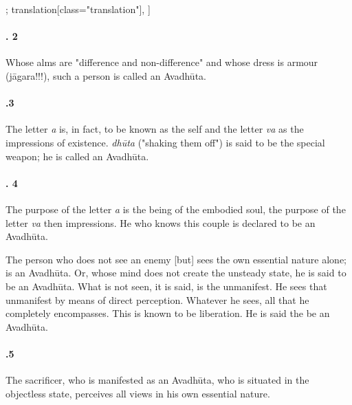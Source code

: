 \begin{alignment}[
  texts=edition[class="edition"];
  translation[class="translation"],
  ]
\begin{translation}
\begin{tlate}
      \paragraph{. 2} Whose alms are "difference and non-difference" and whose dress is armour (jāgara!!!), such a person is called an Avadhūta.

      \paragraph{.3} The letter \textit{a} is, in fact, to be known as the self and the letter \textit{va} as the impressions of existence. \textit{dhūta} ("shaking them off") is said to be the special weapon; he is called an Avadhūta.
      
      \paragraph{. 4} The purpose of the letter \textit{a} is the being of the embodied soul, the purpose of the letter \textit{va} then impressions. He who knows this couple is declared to be an Avadhūta.
      
      \bigskip
      The person who does not see an enemy [but] sees the own essential nature alone; is an Avadhūta. Or, whose mind does not create the unsteady state, he is said to be an Avadhūta. What is not seen, it is said, is the unmanifest. He sees that unmanifest by means of direct perception. Whatever he sees, all that he completely encompasses. This is known to be liberation. He is said the be an Avadhūta.

      \paragraph{.5} The sacrificer, who is manifested as an Avadhūta, who is situated in the objectless state, perceives all views in his own essential nature.
    \end{tlate}
  \end{translation}
\end{alignment}
\pagebreak %
